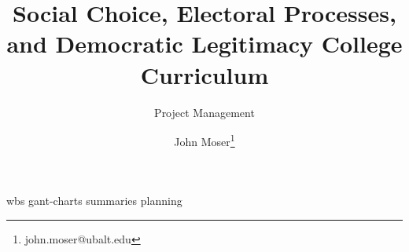 \documentclass[twoside,titlepage,12pt,appendixprefix=true,usenames,dvipsnames]{scrreprt}
\begin{document}
    \author{John Moser\thanks{john.moser@ubalt.edu}}

    \title{Social Choice, Electoral Processes, and Democratic Legitimacy College Curriculum}
    \subtitle{Project Management}
    \maketitle
    \addtocounter{page}{-1}
    \tableofcontents
    \clearpage
    {wbs}
    {gant-charts}
    {summaries}
    {planning}

    \printbibliography
\end{document}
